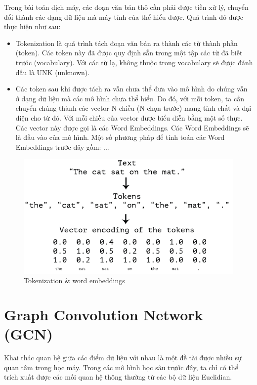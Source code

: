 Trong bài toán dịch máy, các đoạn văn bản thô cần phải được tiền xử lý, chuyển đổi thành các dạng dữ liệu mà máy tính của thể hiểu được. Quá trình đó được thực hiện như sau:
\begin{itemize}
	\item Tokenization là quá trình tách đoạn văn bản ra thành các từ thành phần (token). Các token này đã được quy định sẵn trong một tập các từ đã biết trước (vocabulary). Với các từ lạ, không thuộc trong vocabulary sẽ được đánh dấu là UNK (unknown).
	\item Các token sau khi được tách ra vẫn chưa thể đưa vào mô hình do chúng vẫn ở dạng dữ liệu mà các mô hình chưa thể hiểu. Do đó, với mỗi token, ta cần chuyển chúng thành các vector N chiều (N chọn trước) mang tính chất và đại diện cho từ đó. Với mỗi chiều của vector được biểu diễn bằng một số thực. Các vector này được gọi là các Word Embeddings. Các Word Embeddings sẽ là đầu vào của mô hình. Một số phương pháp để tính toán các Word Embeddings trước đây gồm: ...
\end{itemize}

\begin{figure}[H]
    \begin{center}
        \includegraphics[scale=0.8]{images/token-embeddings}
        \caption{Tokenization \& word embeddings}
        \label{fig:semgcn}
    \end{center}
\end{figure}


\section{Graph Convolution Network (GCN)}
Khai thác quan hệ giữa các điểm dữ liệu với nhau là một đề tài được nhiều sự quan tâm trong học máy. Trong các mô hình học sâu trước đây, ta chỉ có thể trích xuất được các mối quan hệ thông thường từ các bộ dữ liệu Euclidian. 

